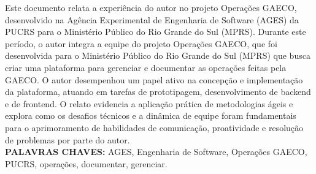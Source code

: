 \begin{resumo}
Este documento relata a experiência do autor no projeto Operações GAECO, desenvolvido na Agência Experimental de Engenharia de Software (AGES) da PUCRS para o Ministério Público do Rio Grande do Sul (MPRS). 
Durante este período, o autor integra a equipe do projeto Operações GAECO, que foi desenvolvida para o Ministério Público do Rio Grande do Sul (MPRS) que busca criar uma plataforma para gerenciar e documentar as operações feitas pela GAECO. 
O autor desempenhou um papel ativo na concepção e implementação da plataforma, atuando em tarefas de prototipagem, desenvolvimento de backend e de frontend. 
O relato evidencia a aplicação prática de metodologias ágeis e explora como os desafios técnicos e a dinâmica de equipe foram fundamentais para o aprimoramento de habilidades de comunicação, proatividade e resolução de problemas por parte do autor.  
\bigbreak\
  \\\textbf{PALAVRAS CHAVES:}
AGES, Engenharia de Software, Operações GAECO, PUCRS, operações, documentar, gerenciar.  
\end{resumo}